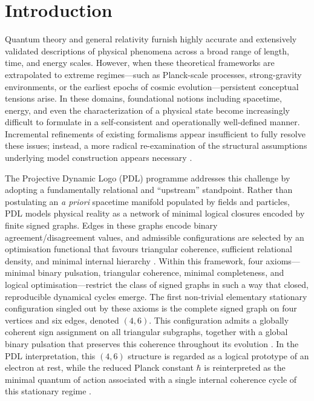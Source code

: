 \documentclass[11pt,a4paper]{article}
\numberwithin{equation}{section}
\begin{document}
\newpage

\section{Introduction}
\label{sec:introduction}

Quantum theory and general relativity furnish highly accurate and extensively validated descriptions of physical phenomena across a broad range of length, time, and energy scales. However, when these theoretical frameworks are extrapolated to extreme regimes---such as Planck-scale processes, strong-gravity environments, or the earliest epochs of cosmic evolution---persistent conceptual tensions arise. In these domains, foundational notions including spacetime, energy, and even the characterization of a physical state become increasingly difficult to formulate in a self-consistent and operationally well-defined manner. Incremental refinements of existing formalisms appear insufficient to fully resolve these issues; instead, a more radical re-examination of the structural assumptions underlying model construction appears necessary \cite{LaubscherCombinatorialProton2026,LaubscherLDP2026}.

The Projective Dynamic Logo (PDL) programme addresses this challenge by adopting a fundamentally relational and ``upstream'' standpoint. Rather than postulating an \textit{a priori} spacetime manifold populated by fields and particles, PDL models physical reality as a network of minimal logical closures encoded by finite signed graphs. Edges in these graphs encode binary agreement/disagreement values, and admissible configurations are selected by an optimisation functional that favours triangular coherence, sufficient relational density, and minimal internal hierarchy \cite{LaubscherIntroPDL2026,LaubscherPDLFull2026,LaubscherLDP2026,LaubscherIMRadPDL2026}. Within this framework, four axioms---minimal binary pulsation, triangular coherence, minimal completeness, and logical optimisation---restrict the class of signed graphs in such a way that closed, reproducible dynamical cycles emerge. The first non-trivial elementary stationary configuration singled out by these axioms is the complete signed graph on four vertices and six edges, denoted $(4,6)$. This configuration admits a globally coherent sign assignment on all triangular subgraphs, together with a global binary pulsation that preserves this coherence throughout its evolution \cite{LaubscherPDLFull2026,LaubscherLDP2026}. In the PDL interpretation, this $(4,6)$ structure is regarded as a logical prototype of an electron at rest, while the reduced Planck constant $\hbar$ is reinterpreted as the minimal quantum of action associated with a single internal coherence cycle of this stationary regime \cite{LaubscherIntroPDL2026,LaubscherPDLFull2026,LaubscherLDP2026}.
\end{document}
